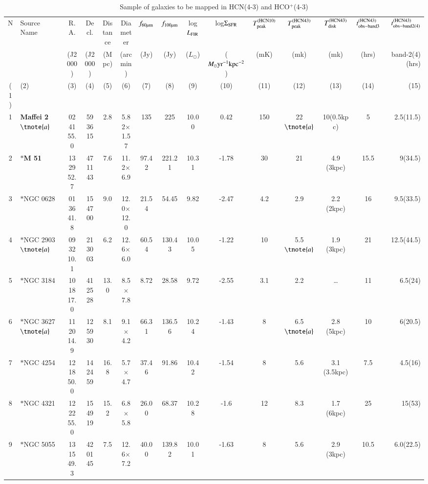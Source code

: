 \documentclass[legal,11pt]{article}
\begin{document}
\begin{table}
\caption{Sample of galaxies to be mapped in HCN(4-3) and HCO$^+$(4-3)}
\label{tbl:sample}
\centering
\scriptsize
\addtolength{\tabcolsep}{-4.5pt}

\begin{threeparttable}[b]
\begin{tabular}{clccccccccccccr}
\hline
\hline

N & Source Name & R.A. & Decl. & Distance & Diameter & $f_{\rm 60\mu m}$ & $f_{\rm 100\mu m}$ & log$L_{\rm FIR}$ & log$\Sigma_{\rm SFR}$ & $T_{\rm peak}^{\rm (HCN10)}$ & $T_{\rm peak}^{\rm (HCN43)}$ & $T_{\rm disk}^{\rm (HCN43)}$  & $t_{\rm obs-band3}^{\rm (HCN43)}$ & $t_{\rm obs-band2(4)}^{\rm (HCN43)}$ \\

  &  & (J2000) & (J2000) & (Mpc) & (arcmin) & (Jy) & (Jy) & ($L_\odot$) & ($M_{\odot} \rm yr^{-1} kpc^{-2}$) & (mK) & (mk) & (mk) & (hrs) & band-2(4)(hrs) \\

(1) & (2)  & (3) & (4) & (5) & (6) & (7) & (8) & (9) & (10) & (11) & (12) & (13) & (14) & (15) \\

\hline

1 & {\bf Maffei 2}$\tnote{a}$ & 02 41 55.0 & 59 36 15 & 2.8 & 5.82$\times$1.57 & 135 & 225 & 10.00 & 0.42 & 150 & 22$\tnote{a}$ & 10(0.5kpc) & 5 & 2.5(11.5) \\  
2 & $\ast${\bf M 51} & 13 29 52.7 & 47 11 43 & 7.6 & 11.2$\times$6.9 & 97.42 & 221.21 & 10.31 & -1.78 & 30 & 21 & 4.9 (3kpc) & 15.5 & 9(34.5) \\
3 & $\ast$NGC 0628 & 01 36 41.8 & 15 47 00 & 9.0 & 12.0$\times$12.0 & 21.54 & 54.45 & 9.82 & -2.47 & 4.2 & 2.9 & 2.2 (2kpc) & 16 & 9.5(33.5)\\
4 & $\ast$NGC 2903$\tnote{a}$ & 09 32 10.1 & 21 30 03 & 6.2 & 12.6$\times$6.0 & 60.54 & 130.43 & 10.05 & -1.22 & 10 & 5.5$\tnote{a}$ & 1.9 (3kpc) & 21 & 12.5(44.5) \\
5 & $\ast$NGC 3184 & 10 18 17.0 & 41 25 28 & 13.0 & 8.5$\times$7.8 & 8.72 & 28.58 & 9.72 & -2.55 & 3.1 & 2.2 & \dots & 11 & 6.5(24) \\
6 & $\ast$NGC 3627$\tnote{a}$ & 11 20 14.9 & 12 59 30 & 8.1 & 9.1$\times$4.2 & 66.31 & 136.56 & 10.24 & -1.43 & 8 & 6.5$\tnote{a}$ & 2.8 (5kpc) & 10 & 6(20.5) \\
7 & $\ast$NGC 4254 & 12 18 50.0 & 14 24 59 &  16.8 & 5.7$\times$4.7 & 37.46 & 91.86 & 10.42 & -1.54 & 8 & 5.6 & 3.1 (3.5kpc) & 7.5 & 4.5(16) \\
8 & $\ast$NGC 4321 & 12 22 55.0 & 15 49 19 &  15.2 & 6.8$\times$5.8 & 26.00 & 68.37 & 10.28 & -1.6 & 12 & 8.3 & 1.7 (6kpc) & 25 & 15(53)\\ 
9 & $\ast$NGC 5055 & 13 15 49.3 & 42 01 45 & 7.5 & 12.6$\times$7.2 & 40.00 & 139.82 & 10.01 & -1.63 & 8 & 5.6 & 2.9 (3kpc) & 10.5 & 6.0(22.5) \\


\end{tabular}
\end{threeparttable}
\end{table}
\end{document}
